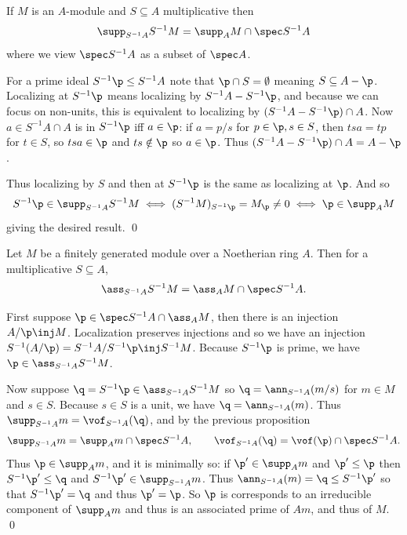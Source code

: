 \bprop[name={supploc}]

    If $M$ is an $A$-module and $S\subseteq A$ multiplicative then
    $$ \supp_{S^{-1}A}S^{-1}M = \supp_AM\cap\spec S^{-1}A $$
    where we view $\spec S^{-1}A$ as a subset of $\spec A$.

\eprop

\bproof

    For a prime ideal $S^{-1}\p\leq S^{-1}A$ note that $\p\cap S=\emptyset$ meaning $S\subseteq A-\p$.
    Localizing at $S^{-1}\p$ means localizing by $S^{-1}A-S^{-1}\p$, and because we can focus on non-units, this is equivalent to localizing by
    $(S^{-1}A-S^{-1}\p)\cap A$.
    Now $a\in S^{-1}A\cap A$ is in $S^{-1}\p$ iff $a\in\p$: if $a=p/s$ for $p\in\p,s\in S$, then $tsa=tp$ for $t\in S$, so $tsa\in\p$ and $ts\notin\p$ so $a\in\p$.
    Thus $(S^{-1}A-S^{-1}\p)\cap A=A-\p$.

    Thus localizing by $S$ and then at $S^{-1}\p$ is the same as localizing at $\p$.
    And so
    $$ S^{-1}\p \in \supp_{S^{-1}A}S^{-1}M \iff (S^{-1}M)_{S^{-1}\p} = M_\p \neq 0 \iff \p \in \supp_AM $$
    giving the desired result.
    \qed

\eproof

\bprop[name={assloc}]

    Let $M$ be a finitely generated module over a Noetherian ring $A$.
    Then for a multiplicative $S\subseteq A$,
    $$ \ass_{S^{-1}A}S^{-1}M = \ass_AM\cap\spec S^{-1}A . $$

\eprop

\bproof

    First suppose $\p\in\spec S^{-1}A\cap\ass_AM$, then there is an injection $A/\p\inj M$.
    Localization preserves injections and so we have an injection $S^{-1}(A/\p)=S^{-1}A/S^{-1}\p\inj S^{-1}M$.
    Because $S^{-1}\p$ is prime, we have $\p\in\ass_{S^{-1}A}S^{-1}M$.

    Now suppose $\q=S^{-1}\p\in\ass_{S^{-1}A}S^{-1}M$ so $\q=\ann_{S^{-1}A}(m/s)$ for $m\in M$ and $s\in S$.
    Because $s\in S$ is a unit, we have $\q=\ann_{S^{-1}A}(m)$.
    Thus $\supp_{S^{-1}A}m=\vof_{S^{-1}A}(\q)$, and by the previous proposition
    $$ \supp_{S^{-1}A}m = \supp_Am \cap \spec S^{-1}A,\qquad \vof_{S^{-1}A}(\q) = \vof(\p)\cap\spec S^{-1}A . $$
    Thus $\p\in\supp_Am$, and it is minimally so: if $\p'\in\supp_Am$ and $\p'\leq\p$ then $S^{-1}\p'\leq \q$ and $S^{-1}\p'\in\supp_{S^{-1}A}m$.
    Thus $\ann_{S^{-1}A}(m)=\q\leq S^{-1}\p'$ so that $S^{-1}\p'=\q$ and thus $\p'=\p$.
    So $\p$ is corresponds to an irreducible component of $\supp_Am$ and thus is an associated prime of $Am$, and thus of $M$.
    \qed

